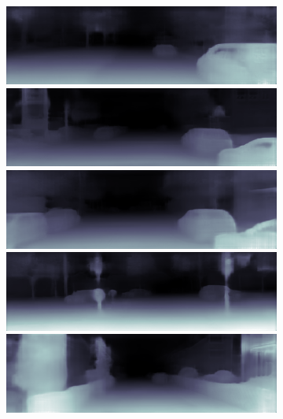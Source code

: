 \begin{figure}[htb]
\begin{subfigure}{0.15\linewidth}
\begin{minipage}[b]{1\linewidth}
  \includegraphics[width=1\linewidth]{figure/kitti_without/2011_09_26_drive_0013_sync_0000000035.png}\vspace{5pt}
  \includegraphics[width=1\linewidth]{figure/kitti_without/2011_09_26_drive_0009_sync_0000000260.png}\vspace{5pt}
  \includegraphics[width=1\linewidth]{figure/kitti_without/2011_09_26_drive_0009_sync_0000000340.png}\vspace{5pt}
  \includegraphics[width=1\linewidth]{figure/kitti_without/2011_09_26_drive_0009_sync_0000000388.png}\vspace{5pt}
  \includegraphics[width=1\linewidth]{figure/kitti_without/2011_09_30_drive_0018_sync_0000000642.png}

\end{minipage}
\end{subfigure}
\end{figure}
